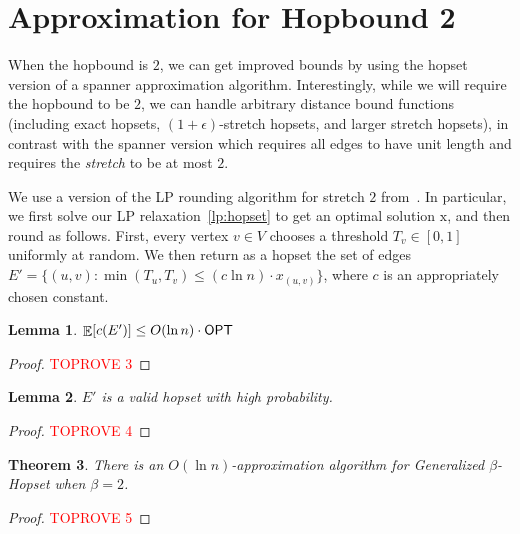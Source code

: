 \documentclass{article}
\newtheorem{theorem}{Theorem}[section]
\newtheorem{lemma}[theorem]{Lemma}
\theoremstyle{definition}
\theoremstyle{remark}
\DeclareMathOperator*{\E}{\mathbb{E}}
\def\be    {\beta}
\def\opt {{\sf OPT}}
\def\hopset {{\sc Generalized $\beta$-Hopset}}
\begin{document}
 



\iflong
\section{Approximation for Hopbound 2} \label{sec:2hop}
When the hopbound is $2$, we can get improved bounds by using the hopset version of a spanner approximation algorithm.  Interestingly, while we will require the hopbound to be $2$, we can handle arbitrary distance bound functions (including exact hopsets, $(1+\epsilon)$-stretch hopsets, and larger stretch hopsets), in contrast with the spanner version which requires all edges to have unit length and requires the \emph{stretch} to be at most $2$.

 
We use a version of the LP rounding algorithm for stretch $2$ from~\cite{DK11}.  In particular, we first solve our LP relaxation~\eqref{lp:hopset} to get an optimal solution $\bm{\mathrm{x}}$, and then round as follows.  First, every vertex $v \in V$ chooses a threshold $T_v \in [0,1]$ uniformly at random.  We then return as a hopset the set of edges $E' = \{(u,v) : \min(T_u, T_v) \leq (c \ln n) \cdot x_{(u,v)} \}$, where $c$ is an appropriately chosen constant. 

\begin{lemma} \label{lem:2hop-cost}
$\E[c(E')] \leq O(\ln n) \cdot \opt$
\end{lemma}
\begin{proof}\textcolor{red}{TOPROVE 3}\end{proof}

\begin{lemma} \label{lem:2hop-correct}
$E'$ is a valid hopset with high probability.
\end{lemma}
\begin{proof}\textcolor{red}{TOPROVE 4}\end{proof}

\begin{theorem} \label{thm:2hop-main}
    There is an $O(\ln n)$-approximation algorithm for {\hopset} when $\be = 2$.
\end{theorem}
\begin{proof}\textcolor{red}{TOPROVE 5}\end{proof}
\else
\fi
\end{document}
